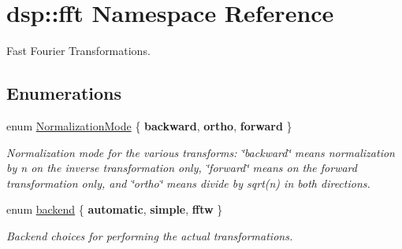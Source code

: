 \hypertarget{namespacedsp_1_1fft}{}\section{dsp\+:\+:fft Namespace Reference}
\label{namespacedsp_1_1fft}


Fast Fourier Transformations.  


\subsection*{Enumerations}
\begin{DoxyCompactItemize}
\item 
\mbox{\label{namespacedsp_1_1fft_aadeffdb34ec53320437b1c6dd1354915}} 
enum \mbox{\hyperlink{namespacedsp_1_1fft_aadeffdb34ec53320437b1c6dd1354915}{Normalization\+Mode}} \{ {\bfseries backward}, 
{\bfseries ortho}, 
{\bfseries forward}
 \}
\begin{DoxyCompactList}\small\item\em Normalization mode for the various transforms\+: \char`\"{}backward\char`\"{} means normalization by n on the inverse transformation only, \char`\"{}forward\char`\"{} means on the forward transformation only, and \char`\"{}ortho\char`\"{} means divide by sqrt(n) in both directions. \end{DoxyCompactList}\item 
\mbox{\label{namespacedsp_1_1fft_a4fef2564f82f5eb8ea2d5c9909fb2ba4}} 
enum \mbox{\hyperlink{namespacedsp_1_1fft_a4fef2564f82f5eb8ea2d5c9909fb2ba4}{backend}} \{ {\bfseries automatic}, 
{\bfseries simple}, 
{\bfseries fftw}
 \}
\begin{DoxyCompactList}\small\item\em Backend choices for performing the actual transformations. \end{DoxyCompactList}\end{DoxyCompactItemize}

